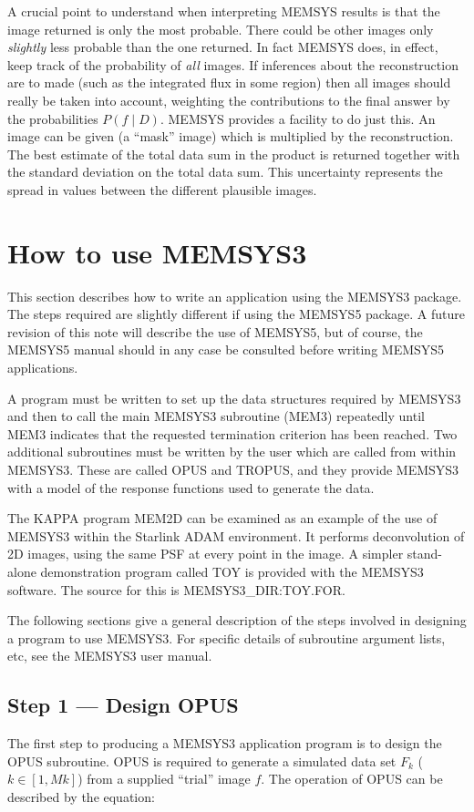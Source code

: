 A crucial point to understand when interpreting MEMSYS results is that the
image returned is only the most probable. There could be other images only
{\em slightly} less probable than the one returned. In fact MEMSYS does, in
effect, keep track of the probability of {\em all} images. If inferences about
the reconstruction are to made (such as the integrated flux in some region)
then all images should really be taken into account, weighting the contributions
to the final answer by the probabilities $P( f \mid D)$. MEMSYS provides a
facility to do just this. An image can be given (a ``mask'' image) which is
multiplied by the
reconstruction. The best estimate of the total data sum in the product is
returned together with the standard deviation on the total data sum. This
uncertainty represents the spread in values between the different plausible
images.


\section {How to use MEMSYS3}
\label {SEC:STEPS}
This section describes how to write an application using the MEMSYS3 package.
The steps required are slightly different if using the MEMSYS5 package. A
future revision of this note will describe the use of MEMSYS5, but of course,
the MEMSYS5 manual should in any case be consulted before writing MEMSYS5
applications.

A program must be written to set up the data structures required by MEMSYS3 and
then to call the main MEMSYS3 subroutine (MEM3) repeatedly until MEM3 indicates
that the requested termination criterion has been reached. Two additional
subroutines must be written by the user which are called from within MEMSYS3.
These are called OPUS and TROPUS, and they provide MEMSYS3 with a model of the
response functions used to generate the data.

The KAPPA program MEM2D can be examined as an example of the use of MEMSYS3
within the Starlink ADAM environment. It performs deconvolution of 2D images,
using the same PSF at every point in the image. A simpler stand-alone
demonstration program called TOY is provided with the MEMSYS3 software. The
source for this is MEMSYS3\_DIR:TOY.FOR.

The following sections give a general description of the steps involved in
designing a program to use MEMSYS3. For specific details of subroutine argument
lists, etc, see the MEMSYS3 user manual.

\subsection {Step 1 --- Design OPUS}
The first step to producing a MEMSYS3 application program is to design the
OPUS subroutine.  OPUS is required to generate a simulated data set
$F_{k}$ ($k\in[1,Mk]$) from a supplied ``trial'' image $f$.
The operation of OPUS can be described by the equation:

